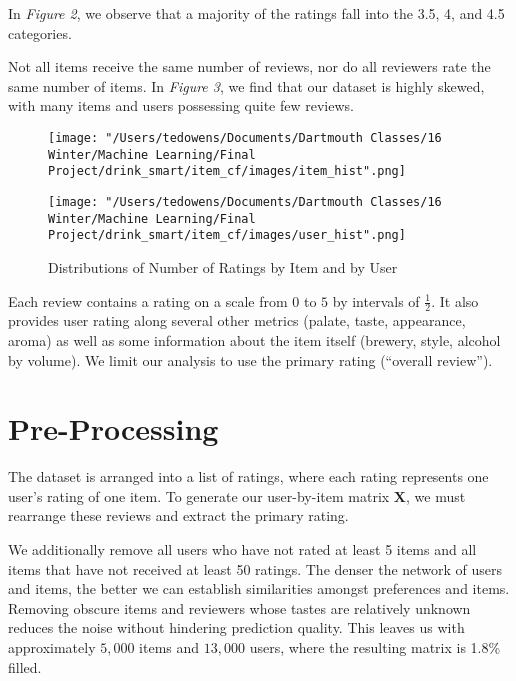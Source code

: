 \documentclass[12pt]{article}
\begin{document}
In \textit{Figure 2}, we observe that a majority of the ratings fall into the 3.5, 4, and 4.5 categories.

Not all items receive the same number of reviews, nor do all reviewers rate the same number of items. In \textit{Figure 3}, we find that our dataset is highly skewed, with many items and users possessing quite few reviews.

\begin{figure}[!ht]
\caption{Distributions of Number of Ratings by Item and by User}
\centering
\begin{minipage}{.5\textwidth}
  \centering
  \texttt{[image: "/Users/tedowens/Documents/Dartmouth Classes/16 Winter/Machine Learning/Final Project/drink\_smart/item\_cf/images/item\_hist".png]}
\end{minipage}%
\begin{minipage}{.5\textwidth}
  \centering
  \texttt{[image: "/Users/tedowens/Documents/Dartmouth Classes/16 Winter/Machine Learning/Final Project/drink\_smart/item\_cf/images/user\_hist".png]}
\end{minipage}
\end{figure}

Each review contains a rating on a scale from $0$ to $5$ by intervals of $\frac{1}{2}$. It also provides user rating along several other metrics (palate, taste, appearance, aroma) as well as some information about the item itself (brewery, style, alcohol by volume). We limit our analysis to use the primary rating (``overall review'').

\section{Pre-Processing}
The dataset is arranged into a list of ratings, where each rating represents one user's rating of one item. To generate our user-by-item matrix $\mathbf{X}$, we must rearrange these reviews and extract the primary rating.

We additionally remove all users who have not rated at least 5 items and all items that have not received at least 50 ratings. The denser the network of users and items, the better we can establish similarities amongst preferences and items. Removing obscure items and reviewers whose tastes are relatively unknown reduces the noise without hindering prediction quality. This leaves us with approximately $5,000$ items and $13,000$ users, where the resulting matrix is 1.8\% filled.
\end{document}

